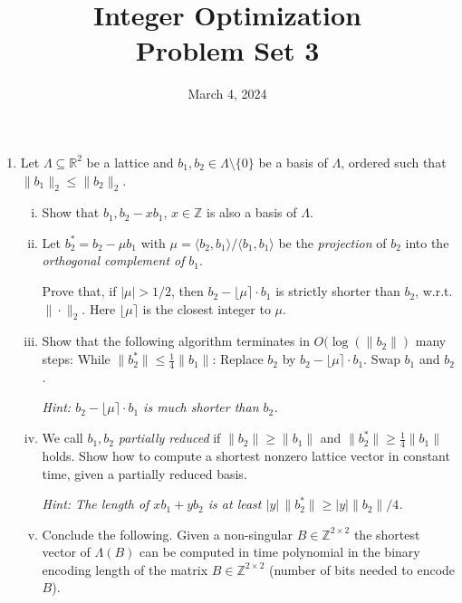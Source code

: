 \documentclass[11pt,a4paper]{article}
\title{Integer Optimization  \\ Problem Set 3 }
\date{ March 4, 2024}
\begin{document}
\maketitle 




\begin{enumerate} 


\item
Let $Λ ⊆ ℝ^2$ be a lattice and $b_1,b_2 ∈ Λ \setminus \{0\}$ be a basis of $Λ$, ordered such that $\|b_1\|_2 ≤ \|b_2\|_2$. 
\begin{enumerate}[i)]
  \item Show that $b_1, b_2 -x b_1$, $x ∈ℤ$ is also a basis of $Λ$.
  \item Let $b_2^* = b_2 - μ b_1$ with $μ = 〈b_2,b_1〉 / 〈b_1,b_1〉    $ be the \emph{projection} of $b_2$ into the \emph{orthogonal
      complement of} $b_1$.

    Prove that, if $|μ| > 1/2$, then $b_2 - ⌊μ⌉ ⋅ b_1$ is strictly shorter than $b_2$, w.r.t. $\|⋅\|_2$. Here $⌊μ⌉$ is the closest integer to $μ$.
    
  \item Show that the following algorithm terminates in $O(\log (\|b_2\|)$ many steps: 
    While $\|b_2^*\| ≤ \frac{1}{4} \|b_1\|$: Replace $b_2$  by  $b_2 - ⌊μ⌉ ⋅ b_1$. Swap $b_1$ and $b_2$.

    \hfill \emph{Hint:  $b_2 - ⌊μ⌉ ⋅ b_1$ is much shorter than $b_2$.}
    
  \item We call    $b_1,b_2$ \emph{partially reduced} if $\|b_2\|≥ \|b_1\|$ and  $\|b_2^*\| ≥ \frac{1}{4} \|b_1\|$ holds. Show how to compute a shortest nonzero lattice vector in constant time, given a partially reduced basis.

    \hfill \emph{Hint: The length of $x b_1 + y b_2$ is at least $|y| \, \|b_2^*\| ≥ |y| \|b_2\| /  4$.}
\item Conclude the following. Given a non-singular $B ∈ ℤ^{2 × 2}$ the shortest vector of $Λ(B)$   can be computed in time polynomial in the binary encoding length  of the matrix  $B ∈ ℤ^{2 ×2}$ (number of bits needed to encode $B$).  
  \end{enumerate}
  

\end{enumerate}
\end{document}
